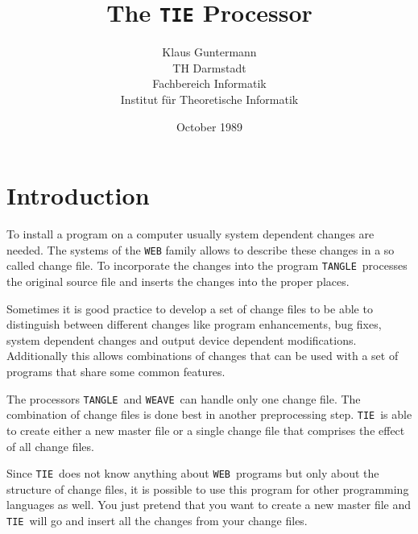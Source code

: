 ﻿%





\let\mc=\small
\def\TANGLE{{\tt TANGLE}}
\def\TIE{{\tt TIE}}
\def\WEAVE{{\tt WEAVE}}
\def\WEB{{\tt WEB}}
\def\CWEB{{\mc CWEB}}
\def\PASCAL{Pascal}




\title{The \TIE{} Processor}
\author{Klaus Guntermann\\
TH Darmstadt\\
Fachbereich Informatik\\
Institut f\"ur Theoretische Informatik}
\date{October 1989}

\maketitle



\section{Introduction}

To install a program on a computer usually
system dependent changes are needed.
The systems of the \WEB{} family allows to describe these changes in a
so called change file.
To incorporate the changes into the program \TANGLE\ processes
the original source file and inserts the changes into the proper places.

Sometimes it is good practice to develop a set of change files to be able to
distinguish between different changes like
program enhancements, bug fixes, system dependent changes 
and output device dependent modifications.
Additionally this allows combinations of changes that can be used with a set of 
programs that share some common features.

The processors \TANGLE\ and \WEAVE\ can handle only one change file.
The combination of change files is done best in another preprocessing step.
\TIE\ is able to create either a new master file or a single change file that 
comprises the effect of all change files.

Since \TIE\ does not know anything about \WEB\ programs but only about the 
structure of change files, it is possible to use this program for other 
programming languages as well.
You just pretend that you want to create a new master file and \TIE\ will go 
and insert all the changes from your change files.



